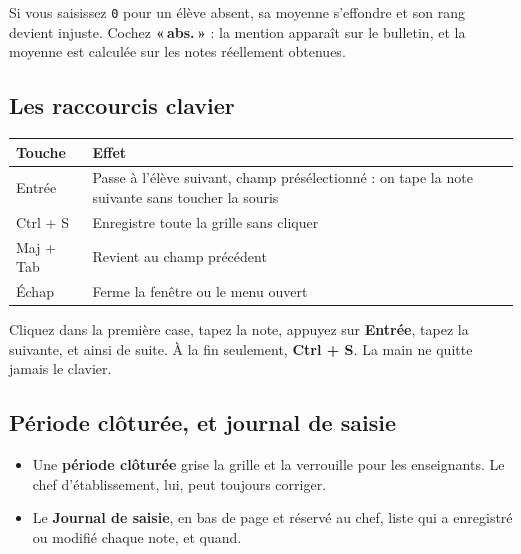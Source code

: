 \documentclass[11pt,a4paper]{article}
\newcommand{\menu}[1]{\textbf{«\,#1\,»}}
\begin{document}
\begin{boiteattention}
Si vous saisissez \texttt{0} pour un élève absent, sa moyenne s'effondre et son
rang devient injuste. Cochez \menu{abs.} : la mention apparaît sur le bulletin,
et la moyenne est calculée sur les notes réellement obtenues.
\end{boiteattention}

\subsection{Les raccourcis clavier}

\begin{center}
\renewcommand{\arraystretch}{1.25}
\begin{tabularx}{\textwidth}{@{} >{\raggedright}p{3.4cm} X@{}}
\toprule
\textbf{Touche} & \textbf{Effet} \\
\midrule
Entrée & Passe à l'élève suivant, champ présélectionné : on tape la note suivante
sans toucher la souris \\
Ctrl + S & Enregistre toute la grille sans cliquer \\
Maj + Tab & Revient au champ précédent \\
Échap & Ferme la fenêtre ou le menu ouvert \\
\bottomrule
\end{tabularx}
\end{center}

\begin{boiteastuce}
Cliquez dans la première case, tapez la note, appuyez sur \textbf{Entrée}, tapez la
suivante, et ainsi de suite. À la fin seulement, \textbf{Ctrl + S}. La main ne
quitte jamais le clavier.
\end{boiteastuce}

\subsection{Période clôturée, et journal de saisie}

\begin{itemize}
  \item Une \textbf{période clôturée} grise la grille et la verrouille pour les
        enseignants. Le chef d'établissement, lui, peut toujours corriger.
  \item Le \textbf{Journal de saisie}, en bas de page et réservé au chef, liste
        qui a enregistré ou modifié chaque note, et quand.
\end{itemize}
\end{document}
